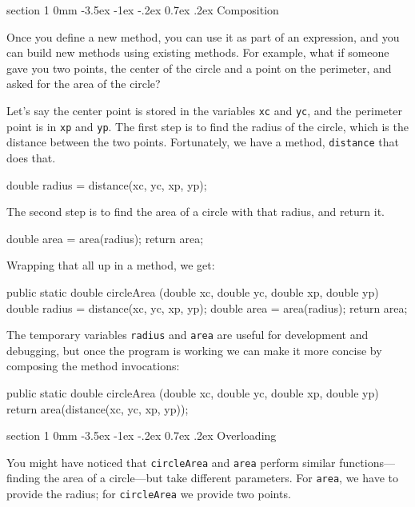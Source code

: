 \documentclass{book}
\makeatletter
\renewcommand{\section}{\@startsection 
    {section} {1} {0mm}%
    {-3.5ex \@plus -1ex \@minus -.2ex}%
    {0.7ex \@plus.2ex}%
    {\normalfont\Large\bfseries}}
\makeatother
\begin{document}
\section{Composition}

Once you define a new method,
you can use it as part of an expression, and you can build
new methods using existing methods.  For example, what if someone
gave you two points, the center of the circle and a point on
the perimeter, and asked for the area of the circle?

Let's say the center point is stored in the variables {\tt xc}
and {\tt yc}, and the perimeter point is in {\tt xp} and
{\tt yp}.  The first step is to find the radius of the circle, which
is the distance between the two points.  Fortunately, we have
a method, {\tt distance} that does that.

\begin{verbatimtab}
    double radius = distance(xc, yc, xp, yp);
\end{verbatimtab}
%
The second step is to find the area of a circle with that
radius, and return it.

\begin{verbatimtab}
    double area = area(radius);
    return area;
\end{verbatimtab}
%
Wrapping that all up in a method, we get:

\begin{verbatimtab}
  public static double circleArea
              (double xc, double yc, double xp, double yp) {
    double radius = distance(xc, yc, xp, yp);
    double area = area(radius);
    return area;
  } 
\end{verbatimtab}
%
The temporary variables {\tt radius} and {\tt area} are
useful for development and debugging, but once the program is
working we can make it more concise by composing
the method invocations:

\begin{verbatimtab}
  public static double circleArea
              (double xc, double yc, double xp, double yp) {
    return area(distance(xc, yc, xp, yp));
  } 
\end{verbatimtab}


\section{Overloading}
\label{overloading}

You might have noticed that {\tt circleArea}
and {\tt area} perform similar functions---finding
the area of a circle---but take different parameters.  For
{\tt area}, we have to provide the radius; for {\tt circleArea}
we provide two points.
\end{document}
